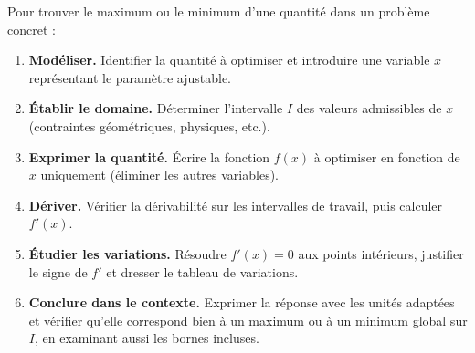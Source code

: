 


\begin{nxprop}
Pour trouver le maximum ou le minimum d'une quantité dans un problème concret :

\begin{enumerate}
  \item \textbf{Modéliser.} Identifier la quantité à optimiser et introduire une
        variable $x$ représentant le paramètre ajustable.
  \item \textbf{Établir le domaine.} Déterminer l'intervalle $I$ des valeurs
        admissibles de $x$ (contraintes géométriques, physiques, etc.).
  \item \textbf{Exprimer la quantité.} Écrire la fonction $f(x)$ à optimiser en
        fonction de $x$ uniquement (éliminer les autres variables).
  \item \textbf{Dériver.} Vérifier la dérivabilité sur les intervalles de travail,
        puis calculer $f'(x)$.
  \item \textbf{Étudier les variations.} Résoudre $f'(x)=0$ aux points intérieurs,
        justifier le signe de $f'$ et dresser le tableau de variations.
  \item \textbf{Conclure dans le contexte.} Exprimer la réponse avec les unités
        adaptées et vérifier qu'elle correspond bien à un maximum ou à un
        minimum global sur $I$, en examinant aussi les bornes incluses.
\end{enumerate}
\end{nxprop}




